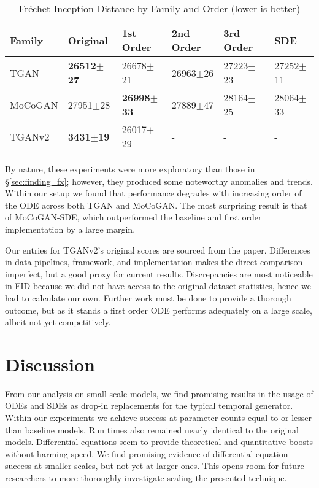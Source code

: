 \documentclass[tablecaption=bottom,pmlr]{jmlr}
\begin{document}
\begin{table}[hbtp]
\centering
\begin{tabular}{llllll}
Family  & Original & 1st Order & 2nd Order & 3rd Order & SDE \\ \toprule
TGAN    &\textbf{26512$\pm$27}&26678$\pm$21&26963$\pm$26&27223$\pm$23&27252$\pm$11\\ \midrule
MoCoGAN &27951$\pm$28&\textbf{26998$\pm$33}&27889$\pm$47&28164$\pm$25&28064$\pm$33\\ \midrule
TGANv2  &\textbf{3431$\pm$19}\footnotemark[2]&26017$\pm$29&     -          &        -      & -   \\ \bottomrule
\end{tabular}
\caption{Fr\'echet Inception Distance by Family and Order (lower is better)}
\label{tab:fam_fid}
\end{table}


By nature, these experiments were more exploratory than those in \S{}\ref{sec:finding_fx}; however, they produced some noteworthy anomalies and trends. Within our setup we found that performance degrades with increasing order of the ODE across both TGAN and MoCoGAN. The most surprising result is that of MoCoGAN-SDE, which outperformed the baseline and first order implementation by a large margin.

Our entries for TGANv2's original scores are sourced from the paper. Differences in data pipelines, framework, and implementation makes the direct comparison imperfect, but a good proxy for current results. Discrepancies are most noticeable in FID because we did not have access to the original dataset statistics, hence we had to calculate our own. Further work must be done to provide a thorough outcome, but as it stands a first order ODE performs adequately on a large scale, albeit not yet competitively.

\section{Discussion}

From our analysis on small scale models, we find promising results in the usage of ODEs and SDEs as drop-in replacements for the typical temporal generator. Within our experiments we achieve success at parameter counts equal to or lesser than baseline models. Run times also remained nearly identical to the original models. Differential equations seem to provide theoretical and quantitative boosts without harming speed. We find promising evidence of differential equation success at smaller scales, but not yet at larger ones. This opens room for future researchers to more thoroughly investigate scaling the presented technique.
\end{document}
